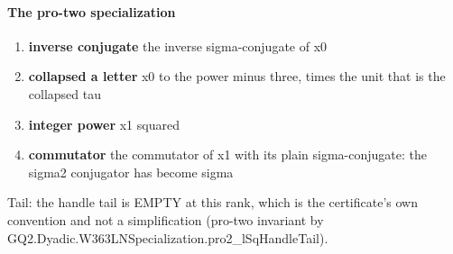 \paragraph{The pro-two specialization}
\begin{enumerate}
\item[(1)] \textbf{inverse conjugate} the inverse sigma-conjugate of x0
\item[(2)] \textbf{collapsed a letter} x0 to the power minus three, times the unit that is the collapsed tau
\item[(3)] \textbf{integer power} x1 squared
\item[(4)] \textbf{commutator} the commutator of x1 with its plain sigma-conjugate: the sigma2 conjugator has become sigma
\end{enumerate}
Tail: the handle tail is EMPTY at this rank, which is the certificate's own convention and not a simplification (pro-two invariant by GQ2.Dyadic.W363LNSpecialization.pro2\_lSqHandleTail).
